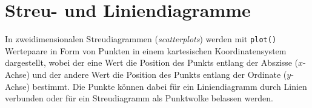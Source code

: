 %
%

\section{Streu- und Liniendiagramme}
\label{sec:plot}

In zweidimensionalen Streudiagrammen (\emph{scatterplots}) werden mit \lstinline!plot()! Wertepaare in Form von Punkten in einem kartesischen Koordinatensystem dargestellt, wobei der eine Wert die Position des Punkts entlang der Abszisse ($x$-Achse) und der andere Wert die Position des Punkts entlang der Ordinate ($y$-Achse) bestimmt. Die Punkte können dabei für ein Liniendiagramm durch Linien verbunden oder für ein Streudiagramm als Punktwolke belassen werden.

